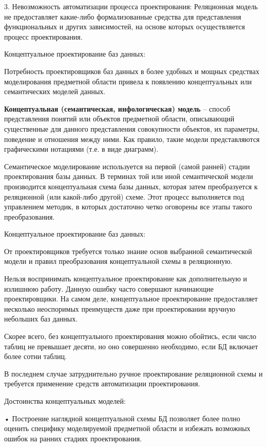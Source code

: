 \documentclass[a4paper,12pt]{article}
\begin{document}
3. Невозможность автоматизации процесса проектирования:
   Реляционная модель не предоставляет какие-либо формализованные 
   средства для представления функциональных и других зависимостей, на 
   основе которых осуществляется процесс проектирования.

Концептуальное проектирование 
баз данных:

Потребность проектировщиков баз данных в более удобных и мощных 
средствах моделирования предметной области привела к появлению 
концептуальных или семантических моделей данных.

\textbf{Концептуальная (семантическая, инфологическая) модель} – способ 
представления понятий или объектов предметной области, описывающий 
существенные для данного представления совокупности объектов, их 
параметры, поведение и отношения между ними. Как правило, такие модели 
представляются графическими нотациями (т.е. в виде диаграмм).

Семантическое моделирование используется на первой (самой ранней) 
стадии проектирования базы данных. В терминах той или иной семантической 
модели производится концептуальная схема базы данных, которая затем 
преобразуется к реляционной (или какой-либо другой) схеме. Этот процесс 
выполняется под управлением методик, в которых достаточно четко 
оговорены все этапы такого преобразования.

Концептуальное проектирование 
баз данных:

От проектировщиков требуется только знание основ выбранной 
семантической модели и правил преобразования концептуальной схемы в 
реляционную.

Нельзя воспринимать концептуальное проектирование как дополнительную и 
излишнюю работу. Данную ошибку часто совершают начинающие 
проектировщики. На самом деле, концептуальное проектирование 
предоставляет несколько неоспоримых преимуществ даже при 
проектировании вручную небольших баз данных.

Скорее всего, без концептуального проектирования можно обойтись, если 
число таблиц не превышает десяти, но оно совершенно необходимо, если БД 
включает более сотни таблиц.

В последнем случае затруднительно ручное проектирование реляционной 
схемы и требуется применение средств автоматизации проектирования.

Достоинства концептуальных 
моделей:

• Построение наглядной концептуальной схемы БД позволяет 
более полно оценить специфику моделируемой предметной 
области и избежать возможных ошибок на ранних стадиях 
проектирования.
\end{document}
